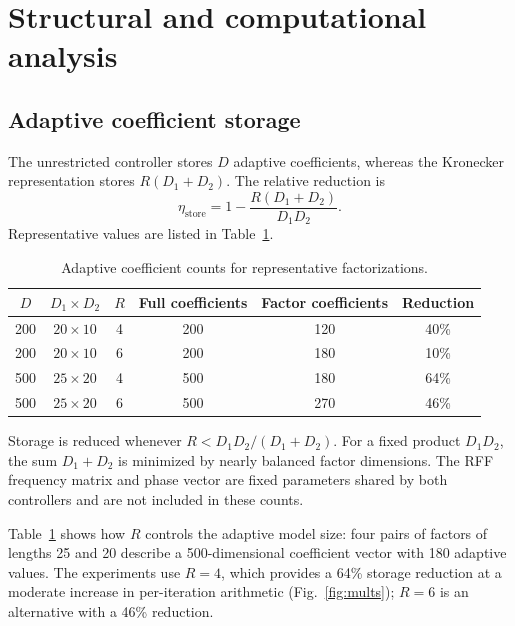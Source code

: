 \documentclass[preprint,12pt]{elsarticle}
\begin{document}
\section{Structural and computational analysis}\label{sec:analysis}

\subsection{Adaptive coefficient storage}

The unrestricted controller stores $D$ adaptive coefficients, whereas the Kronecker representation stores $R(D_1 + D_2)$. The relative reduction is
\begin{equation}
\eta_{\mathrm{store}} = 1 - \frac{R(D_1 + D_2)}{D_1 D_2}.
\end{equation}
Representative values are listed in Table~\ref{tab:storage}.

\begin{table}[t]
\centering
\caption{Adaptive coefficient counts for representative factorizations.}
\label{tab:storage}
\begin{tabular}{cccccc}
\toprule
$D$ & $D_1 \times D_2$ & $R$ & Full coefficients & Factor coefficients & Reduction \\
\midrule
200 & $20 \times 10$ & 4 & 200 & 120 & 40\% \\
200 & $20 \times 10$ & 6 & 200 & 180 & 10\% \\
500 & $25 \times 20$ & 4 & 500 & 180 & 64\% \\
500 & $25 \times 20$ & 6 & 500 & 270 & 46\% \\
\bottomrule
\end{tabular}
\end{table}

Storage is reduced whenever $R < D_1 D_2 / (D_1 + D_2)$. For a fixed product $D_1 D_2$, the sum $D_1 + D_2$ is minimized by nearly balanced factor dimensions. The RFF frequency matrix and phase vector are fixed parameters shared by both controllers and are not included in these counts.

Table~\ref{tab:storage} shows how $R$ controls the adaptive model size: four pairs of factors of lengths 25 and 20 describe a 500-dimensional coefficient vector with 180 adaptive values. The experiments use $R = 4$, which provides a 64\% storage reduction at a moderate increase in per-iteration arithmetic (Fig.~\ref{fig:mults}); $R = 6$ is an alternative with a 46\% reduction.
\end{document}
